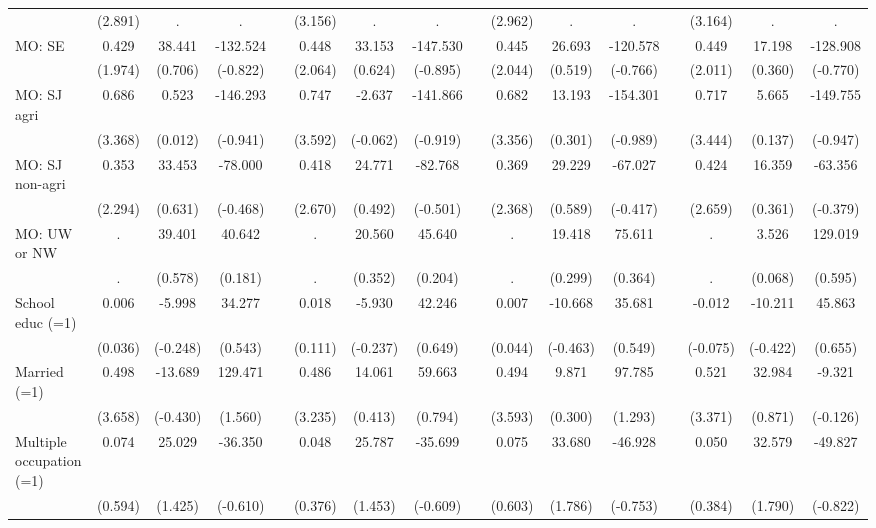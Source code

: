 {\begin{longtable}{@{\extracolsep{\fill}}lccccccccccccccc}
      & (2.891) & . & . &   & (3.156) & . & . &   & (2.962) & . & . &   & (3.164) & . & . \\
    MO: SE & 0.429 & 38.441 & -132.524 &   & 0.448 & 33.153 & -147.530 &   & 0.445 & 26.693 & -120.578 &   & 0.449 & 17.198 & -128.908 \\
      & (1.974) & (0.706) & (-0.822) &   & (2.064) & (0.624) & (-0.895) &   & (2.044) & (0.519) & (-0.766) &   & (2.011) & (0.360) & (-0.770) \\
    MO: SJ agri & 0.686 & 0.523 & -146.293 &   & 0.747 & -2.637 & -141.866 &   & 0.682 & 13.193 & -154.301 &   & 0.717 & 5.665 & -149.755 \\
      & (3.368) & (0.012) & (-0.941) &   & (3.592) & (-0.062) & (-0.919) &   & (3.356) & (0.301) & (-0.989) &   & (3.444) & (0.137) & (-0.947) \\
    MO: SJ non-agri & 0.353 & 33.453 & -78.000 &   & 0.418 & 24.771 & -82.768 &   & 0.369 & 29.229 & -67.027 &   & 0.424 & 16.359 & -63.356 \\
      & (2.294) & (0.631) & (-0.468) &   & (2.670) & (0.492) & (-0.501) &   & (2.368) & (0.589) & (-0.417) &   & (2.659) & (0.361) & (-0.379) \\
    MO: UW or NW & . & 39.401 & 40.642 &   & . & 20.560 & 45.640 &   & . & 19.418 & 75.611 &   & . & 3.526 & 129.019 \\
      & . & (0.578) & (0.181) &   & . & (0.352) & (0.204) &   & . & (0.299) & (0.364) &   & . & (0.068) & (0.595) \\
    School educ (=1) & 0.006 & -5.998 & 34.277 &   & 0.018 & -5.930 & 42.246 &   & 0.007 & -10.668 & 35.681 &   & -0.012 & -10.211 & 45.863 \\
      & (0.036) & (-0.248) & (0.543) &   & (0.111) & (-0.237) & (0.649) &   & (0.044) & (-0.463) & (0.549) &   & (-0.075) & (-0.422) & (0.655) \\
    Married (=1) & 0.498 & -13.689 & 129.471 &   & 0.486 & 14.061 & 59.663 &   & 0.494 & 9.871 & 97.785 &   & 0.521 & 32.984 & -9.321 \\
      & (3.658) & (-0.430) & (1.560) &   & (3.235) & (0.413) & (0.794) &   & (3.593) & (0.300) & (1.293) &   & (3.371) & (0.871) & (-0.126) \\
    Multiple occupation (=1) & 0.074 & 25.029 & -36.350 &   & 0.048 & 25.787 & -35.699 &   & 0.075 & 33.680 & -46.928 &   & 0.050 & 32.579 & -49.827 \\
      & (0.594) & (1.425) & (-0.610) &   & (0.376) & (1.453) & (-0.609) &   & (0.603) & (1.786) & (-0.753) &   & (0.384) & (1.790) & (-0.822) \\

\end{longtable}}
